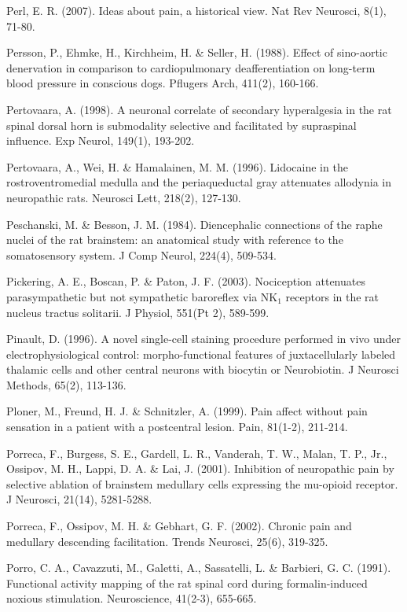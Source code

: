 \documentclass[a4paper,12pt,twoside]{report}
\begin{document}
\begin{singlespacing}
\begin{footnotesize}
Perl, E. R. (2007). Ideas about pain, a historical view. Nat Rev Neurosci, 8(1), 71-80.

Persson, P., Ehmke, H., Kirchheim, H. \& Seller, H. (1988). Effect of sino-aortic denervation in comparison to cardiopulmonary deafferentiation on long-term blood pressure in conscious dogs. Pflugers Arch, 411(2), 160-166.

Pertovaara, A. (1998). A neuronal correlate of secondary hyperalgesia in the rat spinal dorsal horn is submodality selective and facilitated by supraspinal influence. Exp Neurol, 149(1), 193-202.

Pertovaara, A., Wei, H. \& Hamalainen, M. M. (1996). Lidocaine in the rostroventromedial medulla and the periaqueductal gray attenuates allodynia in neuropathic rats. Neurosci Lett, 218(2), 127-130.

Peschanski, M. \& Besson, J. M. (1984). Diencephalic connections of the raphe nuclei of the rat brainstem: an anatomical study with reference to the somatosensory system. J Comp Neurol, 224(4), 509-534.

Pickering, A. E., Boscan, P. \& Paton, J. F. (2003). Nociception attenuates parasympathetic but not sympathetic baroreflex via NK$_{1}$ receptors in the rat nucleus tractus solitarii. J Physiol, 551(Pt 2), 589-599.

Pinault, D. (1996). A novel single-cell staining procedure performed in vivo under electrophysiological control: morpho-functional features of juxtacellularly labeled thalamic cells and other central neurons with biocytin or Neurobiotin. J Neurosci Methods, 65(2), 113-136.

Ploner, M., Freund, H. J. \& Schnitzler, A. (1999). Pain affect without pain sensation in a patient with a postcentral lesion. Pain, 81(1-2), 211-214.

Porreca, F., Burgess, S. E., Gardell, L. R., Vanderah, T. W., Malan, T. P., Jr., Ossipov, M. H., Lappi, D. A. \& Lai, J. (2001). Inhibition of neuropathic pain by selective ablation of brainstem medullary cells expressing the mu-opioid receptor. J Neurosci, 21(14), 5281-5288.

Porreca, F., Ossipov, M. H. \& Gebhart, G. F. (2002). Chronic pain and medullary descending facilitation. Trends Neurosci, 25(6), 319-325.

Porro, C. A., Cavazzuti, M., Galetti, A., Sassatelli, L. \& Barbieri, G. C. (1991). Functional activity mapping of the rat spinal cord during formalin-induced noxious stimulation. Neuroscience, 41(2-3), 655-665.


\end{footnotesize}
\end{singlespacing}
\end{document}
